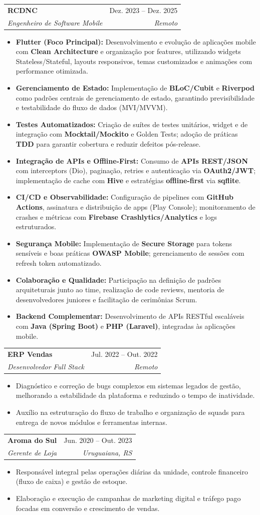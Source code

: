 \documentclass[letterpaper,11pt]{article}
\makeatletter
\newcommand{\resumeItem}[1]{
    \item\small{
            {#1 \vspace{-2pt}}
    }
}
\newcommand{\resumeSubheading}[4]{
    \vspace{-2pt}\item
    \begin{tabular*}{0.97\textwidth}[t]{l@{\extracolsep{\fill}}r}
    \textbf{#1} & #2 \\
    \textit{\small#3} & \textit{\small #4} \\
    \end{tabular*}\vspace{-7pt}
}
\newcommand{\resumeItemListStart}{\begin{itemize}}
\newcommand{\resumeItemListEnd}{\end{itemize}\vspace{-5pt}}
\makeatother
\begin{document}
\resumeSubheading
{RCDNC}{Dez. 2023 -- Dez. 2025}
{Engenheiro de Software Mobile}{Remoto}
\resumeItemListStart
    \resumeItem{\textbf{Flutter (Foco Principal):} Desenvolvimento e evolução de aplicações mobile com \textbf{Clean Architecture} e organização por features, utilizando widgets Stateless/Stateful, layouts responsivos, temas customizados e animações com performance otimizada.}
    \resumeItem{\textbf{Gerenciamento de Estado:} Implementação de \textbf{BLoC/Cubit} e \textbf{Riverpod} como padrões centrais de gerenciamento de estado, garantindo previsibilidade e testabilidade do fluxo de dados (MVI/MVVM).}
    \resumeItem{\textbf{Testes Automatizados:} Criação de suítes de testes unitários, widget e de integração com \textbf{Mocktail/Mockito} e Golden Tests; adoção de práticas \textbf{TDD} para garantir cobertura e reduzir defeitos pós-release.}
    \resumeItem{\textbf{Integração de APIs e Offline-First:} Consumo de \textbf{APIs REST/JSON} com interceptors (Dio), paginação, retries e autenticação via \textbf{OAuth2/JWT}; implementação de cache com \textbf{Hive} e estratégias \textbf{offline-first} via \textbf{sqflite}.}
    \resumeItem{\textbf{CI/CD e Observabilidade:} Configuração de pipelines com \textbf{GitHub Actions}, assinatura e distribuição de apps (Play Console); monitoramento de crashes e métricas com \textbf{Firebase Crashlytics/Analytics} e logs estruturados.}
    \resumeItem{\textbf{Segurança Mobile:} Implementação de \textbf{Secure Storage} para tokens sensíveis e boas práticas \textbf{OWASP Mobile}; gerenciamento de sessões com refresh token automatizado.}
    \resumeItem{\textbf{Colaboração e Qualidade:} Participação na definição de padrões arquiteturais junto ao time, realização de code reviews, mentoria de desenvolvedores juniores e facilitação de cerimônias Scrum.}
    \resumeItem{\textbf{Backend Complementar:} Desenvolvimento de APIs RESTful escaláveis com \textbf{Java (Spring Boot)} e \textbf{PHP (Laravel)}, integradas às aplicações mobile.}
\resumeItemListEnd

\resumeSubheading
{ERP Vendas}{Jul. 2022 -- Out. 2022}
{Desenvolvedor Full Stack}{Remoto}
\resumeItemListStart
    \resumeItem{Diagnóstico e correção de bugs complexos em sistemas legados de gestão, melhorando a estabilidade da plataforma e reduzindo o tempo de inatividade.}
    \resumeItem{Auxílio na estruturação do fluxo de trabalho e organização de squads para entrega de novos módulos e ferramentas internas.}
\resumeItemListEnd

\resumeSubheading
{Aroma do Sul}{Jun. 2020 -- Out. 2023}
{Gerente de Loja}{Uruguaiana, RS}
\resumeItemListStart
    \resumeItem{Responsável integral pelas operações diárias da unidade, controle financeiro (fluxo de caixa) e gestão de estoque.}
    \resumeItem{Elaboração e execução de campanhas de marketing digital e tráfego pago focadas em conversão e crescimento de vendas.}
\resumeItemListEnd
\end{document}
